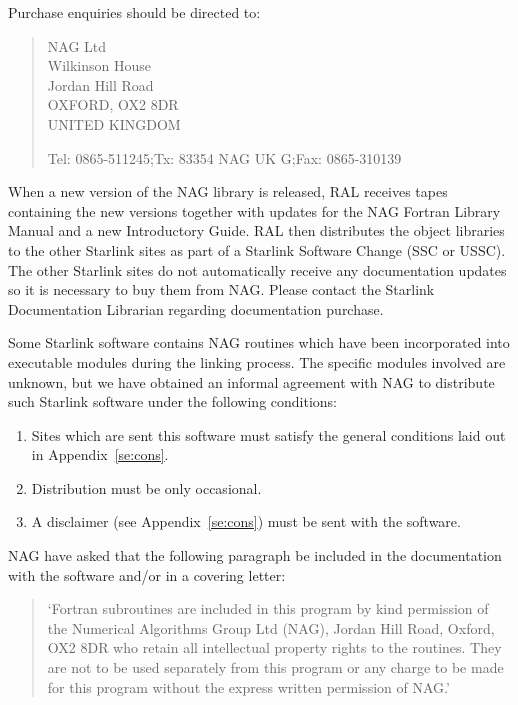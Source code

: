 Purchase enquiries should be directed to:

\begin{verse}
NAG Ltd\\
Wilkinson House\\
Jordan Hill Road\\
OXFORD, OX2 8DR\\
UNITED KINGDOM

Tel: 0865-511245;\hspace{10mm}Tx: 83354 NAG UK G;\hspace{10mm}Fax:
0865-310139\\
\end{verse}

When a new version of the NAG library is released, RAL receives tapes
containing the new versions together with updates for the NAG Fortran Library
Manual and a new Introductory Guide. RAL then distributes the object libraries
to the other Starlink sites as part of a Starlink Software Change (SSC or
USSC). The other Starlink sites do not automatically receive any documentation
updates so it is necessary to buy them from NAG. Please contact the Starlink
Documentation Librarian regarding documentation purchase.

Some Starlink software contains NAG routines which have been incorporated into
executable modules during the linking process.
The specific modules involved are unknown, but we have obtained an informal
agreement with NAG to distribute such Starlink software under the following
conditions:
\begin{enumerate}
\item Sites which are sent this software must satisfy the general conditions
laid out in Appendix~\ref{se:cons}.
\item Distribution must be only occasional.
\item A disclaimer (see Appendix~\ref{se:cons}) must be sent with the software.
\end{enumerate}
NAG have asked that the following paragraph be included in the documentation
with the software and/or in a covering letter:

\begin{quote} 
`Fortran subroutines are included in this program by kind permission of the
Numerical Algorithms Group Ltd (NAG), Jordan Hill Road, Oxford, OX2 8DR who
retain all intellectual property rights to the routines. They are not to be
used separately from this program or any charge to be made for this program
without the express written permission of NAG.' 
\end{quote}

